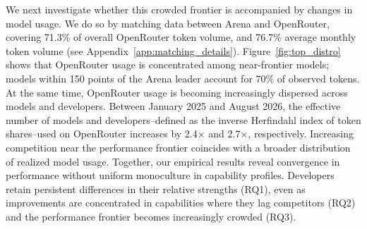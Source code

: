 We next investigate whether this crowded frontier is accompanied by changes in model usage. 
We do so by matching data between Arena and OpenRouter, covering 71.3\% of overall OpenRouter token volume, and 76.7\% average monthly token volume (see Appendix~\ref{app:matching_details}).
Figure~\ref{fig:top_distro} shows that OpenRouter usage is concentrated among near-frontier models; models within 150 points of the Arena leader account for 70\% of observed tokens. 
At the same time, OpenRouter usage is becoming increasingly dispersed across models and developers. 
Between January 2025 and August 2026, the effective number of models and developers--defined as the inverse Herfindahl index of token shares--used on OpenRouter increases by 2.4\(\times\) and 2.7\(\times\), respectively.
Increasing competition near the performance frontier coincides with a broader distribution of realized model usage.
Together, our empirical results reveal convergence in performance without uniform monoculture in capability profiles. 
Developers retain persistent differences in their relative strengths (RQ1), even as improvements are concentrated in capabilities where they lag competitors (RQ2) and the performance frontier becomes increasingly crowded (RQ3). 